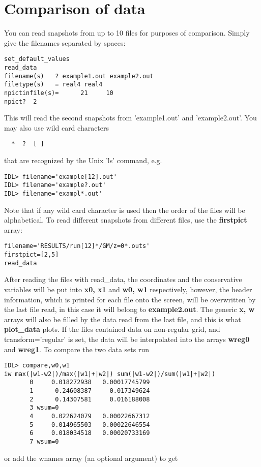 \documentclass{article}
\begin{document}
\section{Comparison of data \label{s-compare}}

You can read snapshots from up to 10 files for purposes of
comparison. Simply give the filenames separated by spaces:
\begin{verbatim}
set_default_values
read_data
filename(s)   ? example1.out example2.out
filetype(s)   = real4 real4
npictinfile(s)=      21     10
npict?  2
\end{verbatim}
This will read the second snapshots from 'example1.out' and
'example2.out'. You may also use wild card characters 
\begin{verbatim}
  *  ?  [ ]
\end{verbatim}
that are recognized by the Unix 'ls' command, e.g.
\begin{verbatim}
IDL> filename='example[12].out'
IDL> filename='example?.out'
IDL> filename='exampl*.out'
\end{verbatim}
Note that if any wild card character is used then the order of the files will 
be alphabetical. To read different snapshots from different files, use the
{\bf firstpict} array:
\begin{verbatim}
filename='RESULTS/run[12]*/GM/z=0*.outs'
firstpict=[2,5]
read_data
\end{verbatim}
After reading the files with read\_data, 
the coordinates and the conservative variables 
will be put into {\bf x0, x1} and {\bf w0, w1} respectively, however, 
the header information, which is printed for each file onto the screen, 
will be overwritten by the last file read, in this case it will belong to
{\bf example2.out}. The generic {\bf x, w} arrays will also be
filled by the data read from the last file, and this is what 
{\bf plot\_data} plots. If the files contained data on non-regular grid,
and transform='regular' is set, the data will be interpolated into 
the arrays {\bf wreg0} and {\bf wreg1}. 
To compare the two data sets run
\begin{verbatim}
IDL> compare,w0,w1
iw max(|w1-w2|)/max(|w1|+|w2|) sum(|w1-w2|)/sum(|w1|+|w2|)
       0     0.018272938   0.00017745799
       1      0.24608387     0.017349624
       2      0.14307581     0.016188008
       3 wsum=0
       4     0.022624079   0.00022667312
       5     0.014965503   0.00022646554
       6     0.018034518   0.00020733169
       7 wsum=0
\end{verbatim}
or add the wnames array (an optional argument) to get
\end{document}
